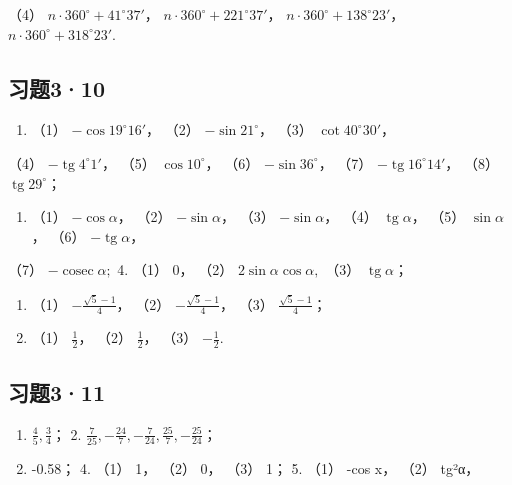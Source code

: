 （4） \(n \cdot 360^{\circ} + 41^{\circ}37'\)，
\(n \cdot 360^{\circ} + 221^{\circ}37'\)，
\(n \cdot 360^{\circ} + 138^{\circ}23'\)，
\(n\cdot360^{\circ} + 318^{\circ}23'\).

\subsection{习题3·10}

\begin{enumerate}[start=2]
\item
  （1） \(-\cos 19^{\circ}16'\)， （2） \(-\sin 21^{\circ}\)， （3）
  \(\cot 40^{\circ}30'\)，
\end{enumerate}

（4） \(-\operatorname{tg} 4^{\circ} 1'\)， （5） \(\cos 10^{\circ}\)，
（6） \(-\sin 36^{\circ}\)， （7）
\(-\operatorname{tg} 16^{\circ} 14'\)， （8）
\(\operatorname{tg} 29^{\circ}\)；

\begin{enumerate}[start=3]
\item
  （1） \(-\cos \alpha\)， （2） \(-\sin \alpha\)， （3）
  \(-\sin \alpha\)， （4） \(\operatorname{tg} \alpha\)， （5）
  \(\sin \alpha\)， （6） \(-\operatorname{tg} \alpha\)，
\end{enumerate}

（7） \(-\operatorname{cosec} \alpha;\) 4. （1） 0， （2）
\(2\sin \alpha \cos \alpha,\) （3） \(\operatorname{tg} \alpha\)；

\begin{enumerate}[start=5]
\item
  （1） \(-\frac{\sqrt{5} - 1}{4}\)， （2）
  \(-\frac{\sqrt{5} - 1}{4}\)， （3） \(\frac{\sqrt{5} - 1}{4}\)；
\item
  （1） \(\frac{1}{2}\)， （2） \(\frac{1}{2}\)， （3）
  \(-\frac{1}{2}\).
\end{enumerate}

\subsection{习题3·11}

\begin{enumerate}
\item
  \(\frac{4}{5}, \frac{3}{4}\)； 2.
  \(\frac{7}{25}, -\frac{24}{7}, -\frac{7}{24}, \frac{25}{7}, -\frac{25}{24}\)；
\item
  -0.58； 4. （1） 1， （2） 0， （3） 1； 5. （1） -cos x， （2）
  tg²α，
\end{enumerate}

